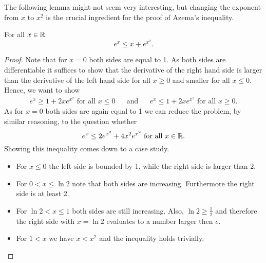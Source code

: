 		
		
The following lemma might not seem very interesting, but changing the exponent from $x$ to $x^2$ is the crucial ingredient for the proof of Azema's inequality.
\begin{lemma}\label{lem:exToex2} For all $x\in\mathbb{R}$
	\[e^{x}\leq x+e^{x^2}.\]
\end{lemma} 
\begin{proof}
	Note that for $x=0$ both sides are equal to 1. As both sides are differentiable it suffices to show that the derivative of the right hand side is larger than the derivative of the left hand side for all $x\geq0$ and smaller for all $x\leq0$. Hence, we want to show
	\begin{align*}
		e^x\geq 1+2xe^{x^2}\text{ for all $x\leq 0$} &   & \text{and} &   & e^x\leq 1+2xe^{x^2}\text{ for all $x\geq 0$}. 
	\end{align*}
	As for $x=0$ both sides are again equal to 1 we can reduce the problem, by similar reasoning, to the question whether
	\[e^x\leq 2e^{x^2}+4x^2e^{x^2}\text{ for all $x\in\mathbb{R}$}.\]
	Showing this inequality comes down to a case study.
	\begin{itemize}
		\item For $x\leq0$ the left side is bounded by 1, while the right side is larger than 2.
		\item For $0<x\leq\ln 2$ note that both sides are increasing. Furthermore the right side is at least 2.
		\item For $\ln2<x\leq1$ both sides are still increasing. Also, $\ln2\geq\frac{1}{2}$ and therefore the right side with $x=\ln2$ evaluates to a number larger then $e$.  
		\item For $1< x$ we have $x< x^2$ and the inequality holds trivially.
	\end{itemize}
\end{proof}
		
